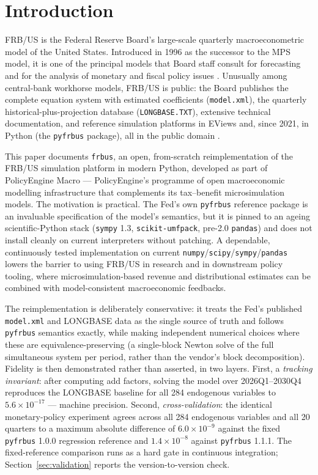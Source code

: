 \section{Introduction}
\label{sec:intro}

FRB/US is the Federal Reserve Board's large-scale quarterly macroeconometric model of the United States. Introduced in 1996 as the successor to the MPS model, it is one of the principal models that Board staff consult for forecasting and for the analysis of monetary and fiscal policy issues \citep{brayton1996guide, brayton2014note}. Unusually among central-bank workhorse models, FRB/US is public: the Board publishes the complete equation system with estimated coefficients (\texttt{model.xml}), the quarterly historical-plus-projection database (\texttt{LONGBASE.TXT}), extensive technical documentation, and reference simulation platforms in EViews and, since 2021, in Python (the \texttt{pyfrbus} package), all in the public domain \citep{fedfrbusabout, fedfrbuspython}.

This paper documents \texttt{frbus}, an open, from-scratch reimplementation of the FRB/US simulation platform in modern Python, developed as part of PolicyEngine Macro --- PolicyEngine's programme of open macroeconomic modelling infrastructure that complements its tax--benefit microsimulation models. The motivation is practical. The Fed's own \texttt{pyfrbus} reference package is an invaluable specification of the model's semantics, but it is pinned to an ageing scientific-Python stack (\texttt{sympy} 1.3, \texttt{scikit-umfpack}, pre-2.0 \texttt{pandas}) and does not install cleanly on current interpreters without patching. A dependable, continuously tested implementation on current \texttt{numpy}/\texttt{scipy}/\texttt{sympy}/\texttt{pandas} lowers the barrier to using FRB/US in research and in downstream policy tooling, where microsimulation-based revenue and distributional estimates can be combined with model-consistent macroeconomic feedbacks.

The reimplementation is deliberately conservative: it treats the Fed's published \texttt{model.xml} and LONGBASE data as the single source of truth and follows \texttt{pyfrbus} semantics exactly, while making independent numerical choices where these are equivalence-preserving (a single-block Newton solve of the full simultaneous system per period, rather than the vendor's block decomposition). Fidelity is then demonstrated rather than asserted, in two layers. First, a \emph{tracking invariant}: after computing add factors, solving the model over 2026Q1--2030Q4 reproduces the LONGBASE baseline for all 284 endogenous variables to $5.6\times10^{-17}$ --- machine precision. Second, \emph{cross-validation}: the identical monetary-policy experiment agrees across all 284 endogenous variables and all 20 quarters to a maximum absolute difference of $6.0\times10^{-9}$ against the fixed \texttt{pyfrbus} 1.0.0 regression reference and $1.4\times10^{-8}$ against \texttt{pyfrbus} 1.1.1. The fixed-reference comparison runs as a hard gate in continuous integration; Section~\ref{sec:validation} reports the version-to-version check.

